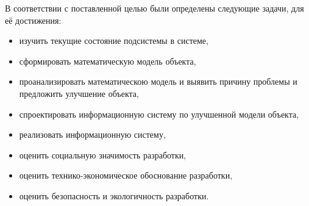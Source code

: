 В соответствии с поставленной целью были определены следующие задачи, для её достижения:
\begin{itemize}
    \item изучить текущие состояние подсистемы в системе,
    \item сформировать математическую модель объекта,
    \item проанализировать математическою модель и выявить причину проблемы и предложить улучшение объекта, 
    \item спроектировать информационную систему по улучшенной модели объекта,
    \item реализовать информационную систему,
    \item оценить социальную значимость разработки,  
    \item оценить технико-экономическое обоснование разработки,
    \item оценить безопасность и экологичность разработки.
\end{itemize}

 
\pagebreak